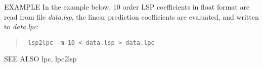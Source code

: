 \begin{options}
\end{options}

\begin{qsection}{EXAMPLE}
In the example below, 10 order LSP coefficients in float format
are read from file {\em data.lsp}, the linear prediction coefficients
are evaluated, and written to {\em data.lpc}:
\begin{quote}
\verb! lsp2lpc -m 10 < data.lsp > data.lpc!
\end{quote}
\end{qsection}

\begin{qsection}{SEE ALSO}
lpc, lpc2lsp
\end{qsection}
